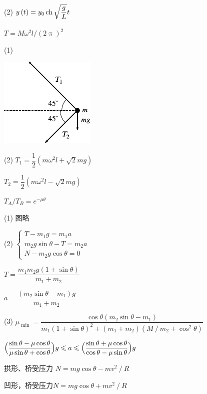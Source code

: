 (2) $ y \left( t \right) = y _ { 0 } \operatorname{ch} \sqrt { \dfrac g L }  t $

\answer $ T = M \omega ^ { 2 } l \big/ \left( 2 \uppi \right) ^ { 2 }   $

\answer (1) \vspace{-2em}
\begin{figurex}
    \centering
    \includegraphics{figure/figa03.02}
    \caption{}
    \label{figa:03.02}
\end{figurex}

(2) $ T _ { 1 } = \dfrac { 1 } { 2 } \left( m \omega ^ { 2 } l + \sqrt { 2 } m g \right) $

\aindent $ T _ { 2 } = \dfrac { 1 } { 2 } \left( m \omega ^ { 2 } l - \sqrt { 2 } m g \right) $

\answer $ T _ { A } \big/ T _ { B } = e ^ { - \mu \theta }  $

\answer (1) 图略

(2) $\begin{cases}T-m_{1} g=m_{1} a \\ m_{2} g \sin \theta-T=m_{2} a \\ N-m_{2} g \cos \theta=0\end{cases}$

\aindent $T=\dfrac{m_{1} m_{2} g(1+\sin \theta)}{m_{1}+m_{2}}$

\aindent $a=\dfrac{\left(m_{2} \sin \theta-m_{1}\right) g}{m_{1}+m_{2}}$

(3) $\mu_{\text { min }}=\dfrac{\cos \theta\left(m_{2} \sin \theta-m_{1}\right)}{m_{1}(1+\sin \theta)^{2}+\left(m_{1}+m_{2}\right)\left(M \operatorname{/} m_{2}+\cos ^{2} \theta\right)}$

\answer $\Bigl(\dfrac{\sin \theta-\mu \cos \theta}{\mu \sin \theta+\cos \theta}\Bigr) g \leqslant a \leqslant\Bigl(\dfrac{\sin \theta+\mu \cos \theta}{\cos \theta-\mu \sin \theta}\Bigr) g$

\answer 拱形、桥受压力 $ N = m g \cos \theta - m  v ^ { 2 }  \operatorname{/}  R    $

凹形，桥受压力$  N = m g \cos \theta + m v ^ { 2 } \operatorname{/} R $
